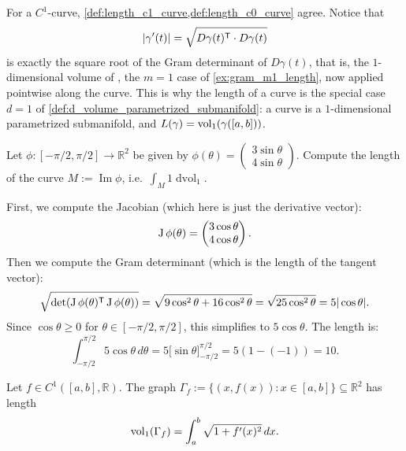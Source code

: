 \begin{remark}
For a $C^1$-curve, \cref{def:length_c1_curve,def:length_c0_curve} agree. Notice that
\[\lvert\gamma'(t)\rvert = \sqrt{D\gamma(t)^{\mathsf{T}} \cdot D\gamma(t)}\]
is exactly the square root of the Gram determinant of $D\gamma(t)$, that is, the
$1$-dimensional volume of , the $m=1$ case of
\cref{ex:gram_m1_length}, now applied
pointwise along the curve. This is why the length of a curve is the special case
$d=1$ of \cref{def:d_volume_parametrized_submanifold}: a curve is a $1$-dimensional
parametrized submanifold, and $L(\gamma) = \operatorname{vol}_1(\gamma([a,b]))$.
\end{remark}

\begin{example}
\label{ex:line_integral}
Let $\phi : [-\pi/2, \pi/2] \to \mathbb{R}^2$ be given by $\phi(\theta) = \begin{pmatrix} 3\sin\theta \\ 4\sin\theta \end{pmatrix}$.
Compute the length of the curve $M := \operatorname{Im}\phi$, i.e.\ $\int_M 1 \mathop{d\text{vol}}_1$.

First, we compute the Jacobian (which here is just the derivative vector):
\[\operatorname{J}\phi(\theta) = \begin{pmatrix} 3\cos\theta \\ 4\cos\theta \end{pmatrix}.\]
Then we compute the Gram determinant (which is the length of the tangent vector):
\[\sqrt{\det(\operatorname{J}\phi(\theta)^{\mathsf{T}} \operatorname{J}\phi(\theta))} = \sqrt{9\cos^2\theta + 16\cos^2\theta} = \sqrt{25\cos^2\theta} = 5|\cos\theta|.\]
Since $\cos\theta \geq 0$ for $\theta \in [-\pi/2, \pi/2]$, this simplifies to $5\cos\theta$.
The length is:
\[\int_{-\pi/2}^{\pi/2} 5\cos\theta \,d\theta = 5\big[\sin\theta\big]_{-\pi/2}^{\pi/2} = 5(1 - (-1)) = 10.\]
\end{example}

\begin{proposition}
\label{prop:graph_arc_length}
Let $f \in C^1([a,b],\mathbb{R})$. The graph
$\Gamma_f := \{(x,f(x)) : x \in [a,b]\} \subseteq \mathbb{R}^2$ has length
\[\operatorname{vol}_1(\Gamma_f) = \int_a^b \sqrt{1+f'(x)^2}\,dx.\]
\end{proposition}

